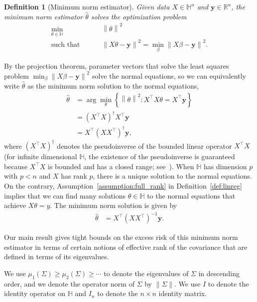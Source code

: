 \documentclass[11pt,notitlepage]{article}
\newcommand\bbH{\mathbb{H}}
\newcommand\R {\mathbb{R}}
\renewcommand\Re{\R}
\newcommand\bs {\boldsymbol}
\newtheorem{definition}[theorem]{Definition}
\begin{document}
\begin{definition}[Minimum norm estimator]\label{def:lne}
  Given data $X\in\bbH^n$ and $\bs{y}\in\Re^n$,
  the {\em minimum norm estimator} $\hat\theta$ solves the optimization problem
    \begin{align*}
      \min_{\theta\in\bbH} \qquad & \left\|\theta\right\|^2 \\
      \text{such that }\qquad & \left\|X\theta-\bs{y}\right\|^2
        = \min_\beta \left\|X\beta-\bs{y}\right\|^2.
    \end{align*}
\end{definition}
By the projection theorem, parameter vectors that solve the least squares
problem $\min_\beta \left\|X\beta-\bs{y}\right\|^2$ solve the normal
equations, so we can equivalently write $\hat\theta$ as the minimum norm
solution to the normal equations,
  \begin{align*}
    \hat\theta
      & =\arg\min_\theta\left\{\left\|\theta\right\|^2:
        X^\top X\theta = X^\top \bs{y} \right\} \\
      & = \left(X^\top X\right)^\dagger X^\top \bs{y} \\
      & = X^\top\left(XX^\top\right)^\dagger\bs{y},
  \end{align*}
where $\left(X^\top X\right)^\dagger$ denotes the pseudoinverse of the
bounded linear operator $X^\top X$ (for infinite dimensional $\bbH$,
the existence of the pseudoinverse is guaranteed because $X^\top X$ is
bounded and has a closed range; see~\cite{dw-np-63}). When $\bbH$ has dimension $p$ with $p<n$ and $X$ has rank $p$, there is a unique
solution to the normal equations. 
On the contrary,
Assumption~\ref{assumption:full_rank} in Definition~\ref{def:linreg}
implies that we can find many solutions $\theta\in\bbH$ to the normal
equations that achieve $X\theta=y$.  
The minimum norm solution is given by
  \begin{align}
    \hat\theta & = X^\top\left(XX^\top\right)^{-1}\bs{y}.
            \label{equation:hattheta}
  \end{align}

Our main result gives tight bounds on the excess risk of this minimum
norm estimator in terms of certain notions of effective rank of the
covariance that are defined in terms of its eigenvalues.

We use $\mu_1(\Sigma)\ge\mu_2(\Sigma)\ge \cdots$ to denote the
eigenvalues of $\Sigma$ in descending order, and we denote the
operator norm of $\Sigma$ by $\|\Sigma\|$. We use $I$ to denote
the identity operator on $\bbH$ and $I_n$ to denote the $n\times n$
identity matrix.
\end{document}
